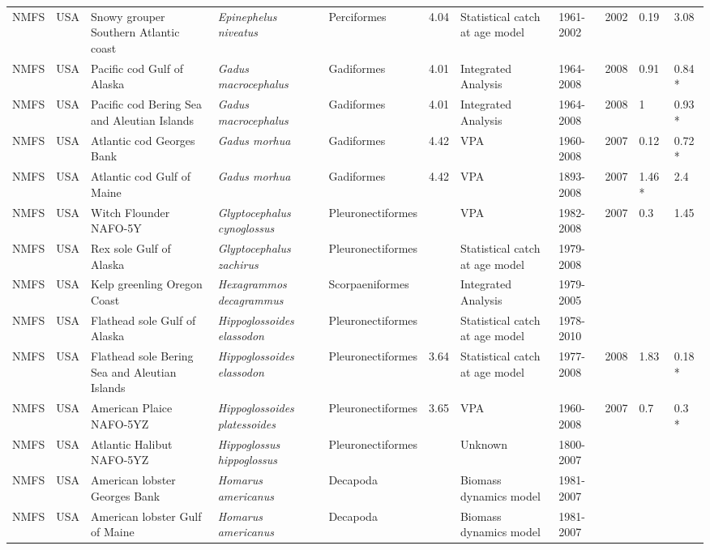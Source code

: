 \begin{longtable}{p{1.5cm}p{1.5cm}p{3cm}p{3cm}p{2.5cm}p{0.9cm}p{1.4cm}p{0.9cm}p{0.9cm}p{0.9cm}p{1cm}}
  NMFS & USA & Snowy grouper Southern Atlantic coast & \textit{Epinephelus niveatus} & Perciformes & 4.04 & Statistical catch at age model & 1961-2002 & 2002 & 0.19 & 3.08 \\ 
  NMFS & USA & Pacific cod Gulf of Alaska & \textit{Gadus macrocephalus} & Gadiformes & 4.01 & Integrated Analysis & 1964-2008 & 2008 & 0.91 & 0.84 * \\ 
  NMFS & USA & Pacific cod Bering Sea and Aleutian Islands & \textit{Gadus macrocephalus} & Gadiformes & 4.01 & Integrated Analysis & 1964-2008 & 2008 & 1 & 0.93 * \\ 
  NMFS & USA & Atlantic cod Georges Bank & \textit{Gadus morhua} & Gadiformes & 4.42 & VPA & 1960-2008 & 2007 & 0.12 & 0.72 * \\ 
  NMFS & USA & Atlantic cod Gulf of Maine & \textit{Gadus morhua} & Gadiformes & 4.42 & VPA & 1893-2008 & 2007 & 1.46 * & 2.4 \\ 
  NMFS & USA & Witch Flounder NAFO-5Y & \textit{Glyptocephalus cynoglossus} & Pleuronectiformes &  & VPA & 1982-2008 & 2007 & 0.3 & 1.45 \\ 
  NMFS & USA & Rex sole Gulf of Alaska & \textit{Glyptocephalus zachirus} & Pleuronectiformes &  & Statistical catch at age model & 1979-2008 &  &  &  \\ 
  NMFS & USA & Kelp greenling Oregon Coast & \textit{Hexagrammos decagrammus} & Scorpaeniformes &  & Integrated Analysis & 1979-2005 &  &  &  \\ 
  NMFS & USA & Flathead sole Gulf of Alaska & \textit{Hippoglossoides elassodon} & Pleuronectiformes &  & Statistical catch at age model & 1978-2010 &  &  &  \\ 
  NMFS & USA & Flathead sole Bering Sea and Aleutian Islands & \textit{Hippoglossoides elassodon} & Pleuronectiformes & 3.64 & Statistical catch at age model & 1977-2008 & 2008 & 1.83 & 0.18 * \\ 
  NMFS & USA & American Plaice NAFO-5YZ & \textit{Hippoglossoides platessoides} & Pleuronectiformes & 3.65 & VPA & 1960-2008 & 2007 & 0.7 & 0.3 * \\ 
  NMFS & USA & Atlantic Halibut NAFO-5YZ & \textit{Hippoglossus hippoglossus} & Pleuronectiformes &  & Unknown & 1800-2007 &  &  &  \\ 
  NMFS & USA & American lobster Georges Bank & \textit{Homarus americanus} & Decapoda &  & Biomass dynamics model & 1981-2007 &  &  &  \\ 
  NMFS & USA & American lobster Gulf of Maine & \textit{Homarus americanus} & Decapoda &  & Biomass dynamics model & 1981-2007 &  &  &  \\ 

\end{longtable}
